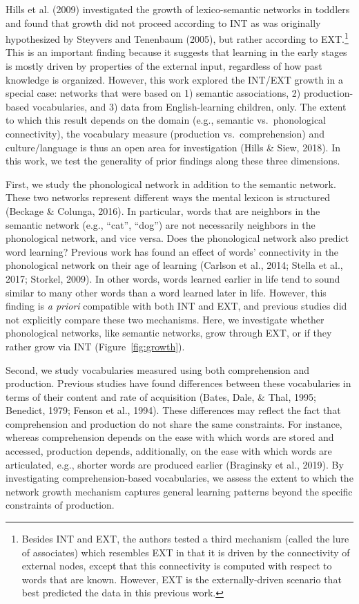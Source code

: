 \documentclass[english,floatsintext,man]{apa6}
\theoremstyle{definition}
\theoremstyle{definition}
\theoremstyle{definition}
\theoremstyle{remark}
\begin{document}
Hills et al. (2009) investigated the growth of lexico-semantic networks
in toddlers and found that growth did not proceed according to INT as
was originally hypothesized by Steyvers and Tenenbaum (2005), but rather
according to
EXT.\footnote{Besides INT and EXT, the authors tested a third mechanism (called the lure of associates) which resembles EXT in that it is driven by the connectivity of external nodes, except that this connectivity is computed with respect to words that are known. However, EXT is the externally-driven scenario that best predicted the data in this previous work.}
This is an important finding because it suggests that learning in the
early stages is mostly driven by properties of the external input,
regardless of how past knowledge is organized. However, this work
explored the INT/EXT growth in a special case: networks that were based
on 1) semantic associations, 2) production-based vocabularies, and 3)
data from English-learning children, only. The extent to which this
result depends on the domain (e.g., semantic vs.~phonological
connectivity), the vocabulary measure (production vs.~comprehension) and
culture/language is thus an open area for investigation (Hills \& Siew,
2018). In this work, we test the generality of prior findings along
these three dimensions.

First, we study the phonological network in addition to the semantic
network. These two networks represent different ways the mental lexicon
is structured (Beckage \& Colunga, 2016). In particular, words that are
neighbors in the semantic network (e.g., \enquote{cat}, \enquote{dog})
are not necessarily neighbors in the phonological network, and vice
versa. Does the phonological network also predict word learning?
Previous work has found an effect of words' connectivity in the
phonological network on their age of learning (Carlson et al., 2014;
Stella et al., 2017; Storkel, 2009). In other words, words learned
earlier in life tend to sound similar to many other words than a word
learned later in life. However, this finding is \emph{a priori}
compatible with both INT and EXT, and previous studies did not
explicitly compare these two mechanisms. Here, we investigate whether
phonological networks, like semantic networks, grow through EXT, or if
they rather grow via INT (Figure~\ref{fig:growth}).

Second, we study vocabularies measured using both comprehension and
production. Previous studies have found differences between these
vocabularies in terms of their content and rate of acquisition (Bates,
Dale, \& Thal, 1995; Benedict, 1979; Fenson et al., 1994). These
differences may reflect the fact that comprehension and production do
not share the same constraints. For instance, whereas comprehension
depends on the ease with which words are stored and accessed, production
depends, additionally, on the ease with which words are articulated,
e.g., shorter words are produced earlier (Braginsky et al., 2019). By
investigating comprehension-based vocabularies, we assess the extent to
which the network growth mechanism captures general learning patterns
beyond the specific constraints of production.
\end{document}
